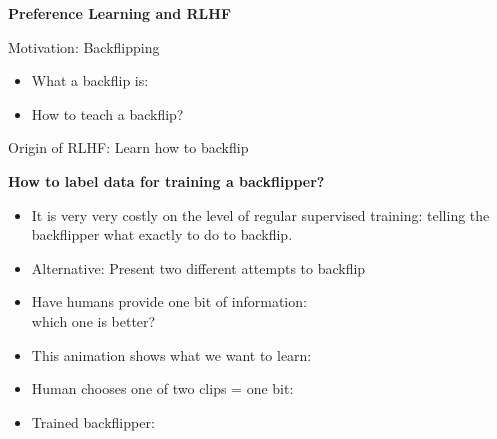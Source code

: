 \documentclass[11pt,compress,t,notes=noshow, xcolor=table]{beamer}
\begin{document}


\begin{frame}[plain]

\vfill

\begin{center}
    {\LARGE \textbf{Preference Learning and RLHF}}
\end{center}

\vfill

\end{frame}



\begin{vbframe}{Motivation: Backflipping}

\vfill
	\begin{itemize}
		\item What a backflip is: \href{https://d2gk6qz8djobw9.cloudfront.net/artwork/595/browse1497710839.gif}{}
        \item How to teach a backflip?
    \end{itemize}
\vfill

\end{vbframe}


\begin{vbframe}{Origin of RLHF: Learn how to backflip}

\vfill

\textbf{How to label data for training a backflipper?}

	\begin{itemize}
		\item It is very very costly on the level of
		regular supervised training: telling the
		backflipper what exactly to do to backflip.
        \item Alternative: Present two different
		attempts to backflip
        \item Have humans provide one bit of
		information:\\ which one is better?
		\item This animation shows what we want to
                  learn: \href{https://images.openai.com/blob/cf6fdf49-ea9e-489d-a1f1-9753291cd09e/humanfeedbackjump.gif}{}
        \item Human chooses one of two clips = one bit: \href{https://player.vimeo.com/video/754042470?h=e64a40690d&badge=0&autopause=0&player_id=0&app_id=58479}{}
        \item Trained backflipper: \href{https://images.openai.com/blob/cf6fdf49-ea9e-489d-a1f1-9753291cd09e/humanfeedbackjump.gif}{}
        \end{itemize}

\vfill

\end{vbframe}
\end{document}
